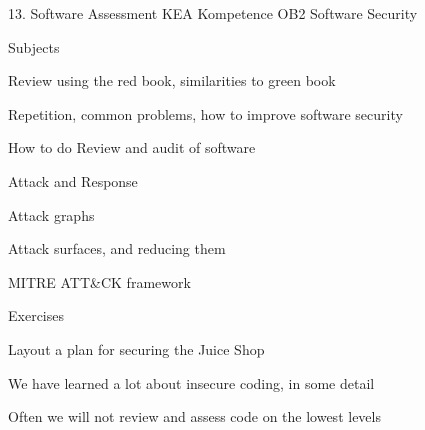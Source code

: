 \documentclass[Screen16to9,17pt]{foils}
\begin{document}
\mytitlepage
{13. Software Assessment}
{KEA Kompetence OB2 Software Security}


\begin{list1}
\item Subjects
\begin{list2}
\item Review using the red book, similarities to green book
\item Repetition, common problems, how to improve software security
\item How to do Review and audit of software
\item Attack and Response
\item Attack graphs
\item Attack surfaces, and reducing them
\item MITRE ATT\&CK framework
\end{list2}
\item Exercises
\begin{list2}
\item Layout a plan for securing the Juice Shop
\end{list2}
\end{list1}






\begin{list1}
\item We have learned a lot about insecure coding, in some detail
\item Often we will not review and assess code on the lowest levels
\end{list1}
\end{document}
